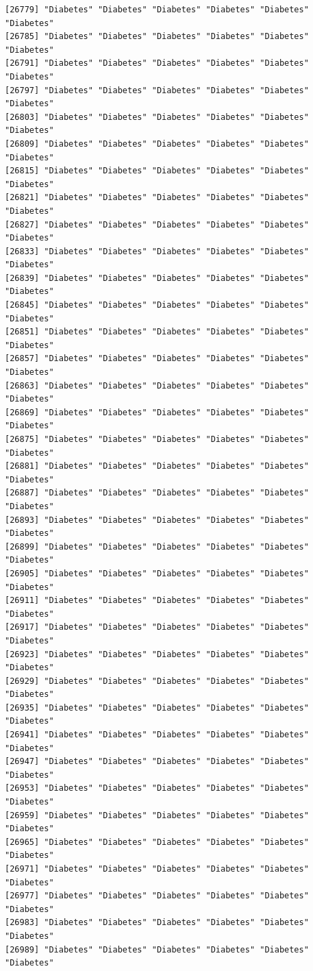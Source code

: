 \documentclass[
  letterpaper,
  DIV=11,
  numbers=noendperiod]{scrartcl}
\begin{document}
\begin{verbatim}
[26779] "Diabetes" "Diabetes" "Diabetes" "Diabetes" "Diabetes" "Diabetes"
[26785] "Diabetes" "Diabetes" "Diabetes" "Diabetes" "Diabetes" "Diabetes"
[26791] "Diabetes" "Diabetes" "Diabetes" "Diabetes" "Diabetes" "Diabetes"
[26797] "Diabetes" "Diabetes" "Diabetes" "Diabetes" "Diabetes" "Diabetes"
[26803] "Diabetes" "Diabetes" "Diabetes" "Diabetes" "Diabetes" "Diabetes"
[26809] "Diabetes" "Diabetes" "Diabetes" "Diabetes" "Diabetes" "Diabetes"
[26815] "Diabetes" "Diabetes" "Diabetes" "Diabetes" "Diabetes" "Diabetes"
[26821] "Diabetes" "Diabetes" "Diabetes" "Diabetes" "Diabetes" "Diabetes"
[26827] "Diabetes" "Diabetes" "Diabetes" "Diabetes" "Diabetes" "Diabetes"
[26833] "Diabetes" "Diabetes" "Diabetes" "Diabetes" "Diabetes" "Diabetes"
[26839] "Diabetes" "Diabetes" "Diabetes" "Diabetes" "Diabetes" "Diabetes"
[26845] "Diabetes" "Diabetes" "Diabetes" "Diabetes" "Diabetes" "Diabetes"
[26851] "Diabetes" "Diabetes" "Diabetes" "Diabetes" "Diabetes" "Diabetes"
[26857] "Diabetes" "Diabetes" "Diabetes" "Diabetes" "Diabetes" "Diabetes"
[26863] "Diabetes" "Diabetes" "Diabetes" "Diabetes" "Diabetes" "Diabetes"
[26869] "Diabetes" "Diabetes" "Diabetes" "Diabetes" "Diabetes" "Diabetes"
[26875] "Diabetes" "Diabetes" "Diabetes" "Diabetes" "Diabetes" "Diabetes"
[26881] "Diabetes" "Diabetes" "Diabetes" "Diabetes" "Diabetes" "Diabetes"
[26887] "Diabetes" "Diabetes" "Diabetes" "Diabetes" "Diabetes" "Diabetes"
[26893] "Diabetes" "Diabetes" "Diabetes" "Diabetes" "Diabetes" "Diabetes"
[26899] "Diabetes" "Diabetes" "Diabetes" "Diabetes" "Diabetes" "Diabetes"
[26905] "Diabetes" "Diabetes" "Diabetes" "Diabetes" "Diabetes" "Diabetes"
[26911] "Diabetes" "Diabetes" "Diabetes" "Diabetes" "Diabetes" "Diabetes"
[26917] "Diabetes" "Diabetes" "Diabetes" "Diabetes" "Diabetes" "Diabetes"
[26923] "Diabetes" "Diabetes" "Diabetes" "Diabetes" "Diabetes" "Diabetes"
[26929] "Diabetes" "Diabetes" "Diabetes" "Diabetes" "Diabetes" "Diabetes"
[26935] "Diabetes" "Diabetes" "Diabetes" "Diabetes" "Diabetes" "Diabetes"
[26941] "Diabetes" "Diabetes" "Diabetes" "Diabetes" "Diabetes" "Diabetes"
[26947] "Diabetes" "Diabetes" "Diabetes" "Diabetes" "Diabetes" "Diabetes"
[26953] "Diabetes" "Diabetes" "Diabetes" "Diabetes" "Diabetes" "Diabetes"
[26959] "Diabetes" "Diabetes" "Diabetes" "Diabetes" "Diabetes" "Diabetes"
[26965] "Diabetes" "Diabetes" "Diabetes" "Diabetes" "Diabetes" "Diabetes"
[26971] "Diabetes" "Diabetes" "Diabetes" "Diabetes" "Diabetes" "Diabetes"
[26977] "Diabetes" "Diabetes" "Diabetes" "Diabetes" "Diabetes" "Diabetes"
[26983] "Diabetes" "Diabetes" "Diabetes" "Diabetes" "Diabetes" "Diabetes"
[26989] "Diabetes" "Diabetes" "Diabetes" "Diabetes" "Diabetes" "Diabetes"

\end{verbatim}
\end{document}
